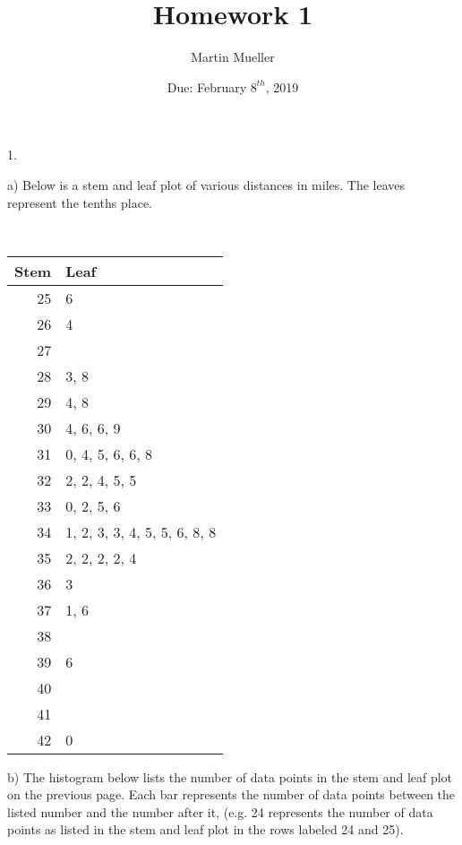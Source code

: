 \documentclass[12pt, letterpaper]{article}
\title{Homework 1}
\author{Martin Mueller}
\date{Due: February $8^{th}$, 2019}
\begin{document}
\maketitle

1.

\qquad a) Below is a stem and leaf plot of various distances in miles. The leaves represent the tenths place.
\begin{table}[h!]{ \ \ \ }
	\centering
	\begin{tabular}{r|l}
		\textbf{Stem} & \textbf{Leaf} \\ \hline
        25 & 6 \\
        26 & 4 \\
        27 & \\
        28 & 3, 8 \\
        29 & 4, 8 \\
        30 & 4, 6, 6, 9 \\
        31 & 0, 4, 5, 6, 6, 8 \\
        32 & 2, 2, 4, 5, 5 \\
        33 & 0, 2, 5, 6 \\
        34 & 1, 2, 3, 3, 4, 5, 5, 6, 8, 8 \\
        35 & 2, 2, 2, 2, 4 \\
        36 & 3 \\
        37 & 1, 6 \\
        38 & \\
        39 & 6 \\
        40 & \\
        41 & \\
        42 & 0 \\
	\end{tabular}
\end{table}

\pagebreak

\qquad b) The histogram below lists the number of data points in the stem and leaf plot on the previous page. Each bar represents the number of data points between the listed number and the number after it, (e.g. 24 represents the number of data points as listed in the stem and leaf plot in the rows labeled 24 and 25).
\begin{center}
\end{center}
\end{document}

